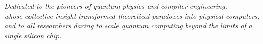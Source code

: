 \cleardoublepage
\thispagestyle{empty}
\vspace*{5cm}
\begin{center}
    \itshape
    Dedicated to the pioneers of quantum physics and compiler engineering,\\
    whose collective insight transformed theoretical paradoxes into physical computers,\\
    and to all researchers daring to scale quantum computing beyond the limits of a single silicon chip.
\end{center}
